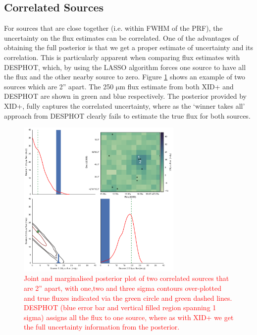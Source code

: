 \documentclass[useAMS,usenatbib]{mnras}
\begin{document}
\subsection{Correlated Sources}
For sources that are close together (i.e. within FWHM of the PRF), the uncertainty on the flux estimates can be correlated. One of the advantages of obtaining the full posterior is that we get a proper estimate of uncertainty and its correlation. This is particularly apparent when comparing flux estimates with \textsc{DESPHOT}, which, by using the LASSO algorithm forces one source to have all the flux and the other nearby source to zero. Figure \ref{fig:corr} shows an example of two sources which are 2'' apart. The 250 $\mathrm{\mu m}$ flux estimate from both \textsc{XID+} and \textsc{DESPHOT} are shown in green and blue respectively. The posterior provided by XID+, fully captures the correlated uncertainty, where as the `winner takes all' approach from \textsc{DESPHOT} clearly fails to estimate the true flux for both sources.
 
\begin{figure} 
\includegraphics[width=8cm]{XID+_vs_DESPHOT_joint.pdf}
\caption{\textcolor{red}{Joint and marginalised posterior plot of two correlated sources that are 2'' apart, with one,two and three sigma contours over-plotted and true fluxes indicated via the green circle and green dashed lines. \textsc{DESPHOT} (blue error bar and vertical filled region spanning 1 sigma) assigns all the flux to one source, where as with \textsc{XID+} we get the full uncertainty information from the posterior.}}\label{fig:corr}
\end{figure}
\end{document}

